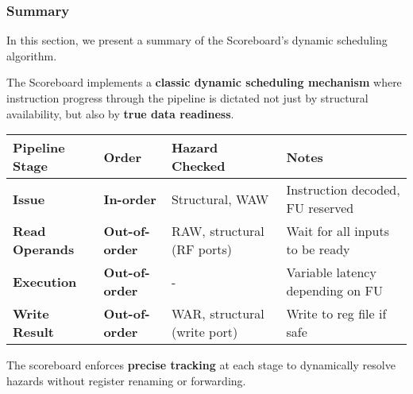 \subsubsection{Summary}

In this section, we present a summary of the Scoreboard's dynamic scheduling algorithm.

\highspace
The Scoreboard implements a \textbf{classic dynamic scheduling mechanism} where instruction progress through the pipeline is dictated not just by structural availability, but also by \textbf{true data readiness}.

\begin{table}[!htp]
    \centering
    \begin{adjustbox}{width={\textwidth},totalheight={\textheight},keepaspectratio}
        \begin{tabular}{@{} l | l | l | l @{}}
            \toprule
            Pipeline Stage & Order & Hazard Checked & Notes \\
            \midrule
            \textbf{Issue}         & \textbf{In-order}     & Structural, WAW              & Instruction decoded, FU reserved    \\ [.5em]
            \textbf{Read Operands} & \textbf{Out-of-order} & RAW, structural (RF ports)   & Wait for all inputs to be ready     \\ [.5em]
            \textbf{Execution}     & \textbf{Out-of-order} & -                            & Variable latency depending on FU    \\ [.5em]
            \textbf{Write Result}  & \textbf{Out-of-order} & WAR, structural (write port) & Write to reg file if safe           \\
            \bottomrule
        \end{tabular}
    \end{adjustbox}
\end{table}

\noindent
The scoreboard enforces \textbf{precise tracking} at each stage to dynamically resolve hazards without register renaming or forwarding.

